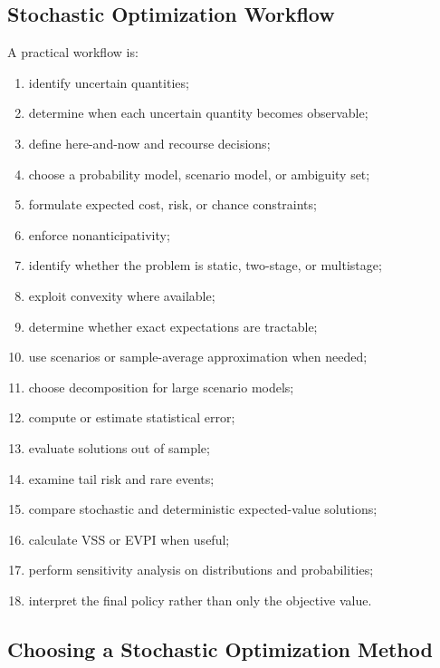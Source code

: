 \subsection{Stochastic Optimization Workflow}
\label{subsec:stochastic-optimization-workflow}

A practical workflow is:

\begin{enumerate}
    \item identify uncertain quantities;
    \item determine when each uncertain quantity becomes observable;
    \item define here-and-now and recourse decisions;
    \item choose a probability model, scenario model, or ambiguity set;
    \item formulate expected cost, risk, or chance constraints;
    \item enforce nonanticipativity;
    \item identify whether the problem is static, two-stage, or multistage;
    \item exploit convexity where available;
    \item determine whether exact expectations are tractable;
    \item use scenarios or sample-average approximation when needed;
    \item choose decomposition for large scenario models;
    \item compute or estimate statistical error;
    \item evaluate solutions out of sample;
    \item examine tail risk and rare events;
    \item compare stochastic and deterministic expected-value solutions;
    \item calculate VSS or EVPI when useful;
    \item perform sensitivity analysis on distributions and probabilities;
    \item interpret the final policy rather than only the objective value.
\end{enumerate}

\subsection{Choosing a Stochastic Optimization Method}
\label{subsec:choosing-stochastic-method}

